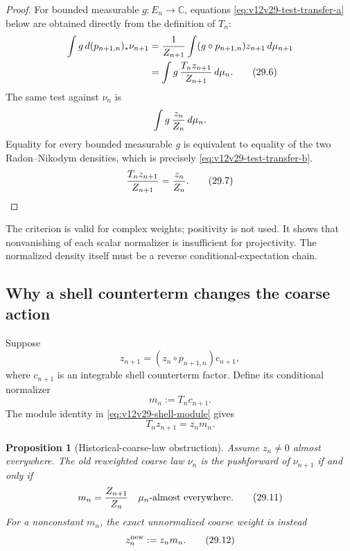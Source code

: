 \documentclass[11pt]{article}
\newtheorem{proposition}[theorem]{Proposition}
\theoremstyle{remark}
\begin{document}
\begin{proof}
For bounded measurable \(g:E_n\to\mathbb C\), equations
\eqref{eq:v12v29-test-transfer-a} below are obtained directly from
the definition of \(T_n\):
\begin{align}
 \int g\,d(p_{n+1,n})_*\nu_{n+1}
 &=
 {1\over Z_{n+1}}
 \int (g\circ p_{n+1,n})z_{n+1}\,d\mu_{n+1}
 \nonumber\\
 &=
 \int g\,{T_nz_{n+1}\over Z_{n+1}}\,d\mu_n.
                                                        \tag{29.6}
 \label{eq:v12v29-test-transfer-a}
\end{align}
The same test against \(\nu_n\) is
\[
 \int g\,{z_n\over Z_n}\,d\mu_n.
\]
Equality for every bounded measurable \(g\) is equivalent to equality
of the two Radon--Nikodym densities, which is precisely
\eqref{eq:v12v29-test-transfer-b}.
\begin{equation}
 {T_nz_{n+1}\over Z_{n+1}}
 =
 {z_n\over Z_n}.                               \tag{29.7}
 \label{eq:v12v29-test-transfer-b}
\end{equation}
\end{proof}

The criterion is valid for complex weights; positivity is not used.
It shows that nonvanishing of each scalar normalizer is insufficient
for projectivity.  The normalized density itself must be a reverse
conditional-expectation chain.

\subsection{Why a shell counterterm changes the coarse action}

Suppose
\begin{equation}
 z_{n+1}
 =
 (z_n\circ p_{n+1,n})c_{n+1},                  \tag{29.8}
\end{equation}
where \(c_{n+1}\) is an integrable shell counterterm factor.  Define
its conditional normalizer
\begin{equation}
 m_n:=T_nc_{n+1}.                               \tag{29.9}
\end{equation}
The module identity in \eqref{eq:v12v29-shell-module} gives
\begin{equation}
 T_nz_{n+1}=z_nm_n.                             \tag{29.10}
 \label{eq:v12v29-shell-module}
\end{equation}

\begin{proposition}[Historical-coarse-law obstruction]
\label{prop:v12v29-historical-obstruction}
Assume \(z_n\ne0\) almost everywhere.  The old reweighted coarse law
\(\nu_n\) is the pushforward of \(\nu_{n+1}\) if and only if
\begin{equation}
 m_n={Z_{n+1}\over Z_n}
 \quad\text{\(\mu_n\)-almost everywhere}.        \tag{29.11}
\end{equation}
For a nonconstant \(m_n\), the exact unnormalized coarse weight is
instead
\begin{equation}
 z_n^{\rm new}:=z_nm_n.                         \tag{29.12}
\end{equation}
\end{proposition}
\end{document}
